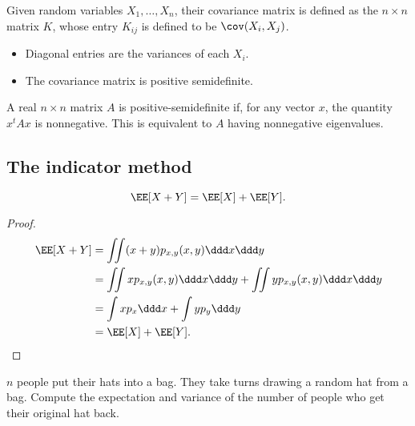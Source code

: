 \begin{definition}

Given random variables $X_1, \hdots, X_n$, their \ac{covariance matrix} is defined as the $n\times n$ matrix $K$, whose entry $K_{ij}$ is defined to be $\cov(X_i, X_j)$. 
\end{definition}

\begin{itemize}
    \item Diagonal entries are the variances of each $X_i$. 
    \item The covariance matrix is positive semidefinite. 
\end{itemize}

\begin{definition}
    
    A real $n\times n$ matrix $A$ is positive-semidefinite if, for any vector $x$, the quantity $x^tAx$ is nonnegative. This is equivalent to $A$ having nonnegative eigenvalues. 
\end{definition}

\subsection{The indicator method}

\begin{theorem}

\[\EE[X+Y] = \EE[X] + \EE[Y].\]
\end{theorem}

\begin{proof}
    \begin{align*}
        \EE[X+Y] &= \iint (x+y)p_{x,y}(x,y)\ddd x \ddd y\\
        &= \iint xp_{x,y}(x,y)\ddd x\ddd y + \iint yp_{x,y}(x,y) \ddd x\ddd y\\
        &= \int xp_x\ddd x + \int yp_y\ddd y \\
        &= \EE[X] + \EE[Y]. 
    \end{align*}
\end{proof}

\begin{example}
\exlabel

$n$ people put their hats into a bag. They take turns drawing a random hat from a bag. Compute the expectation and variance of the number of people who get their original hat back. 
\end{example}

